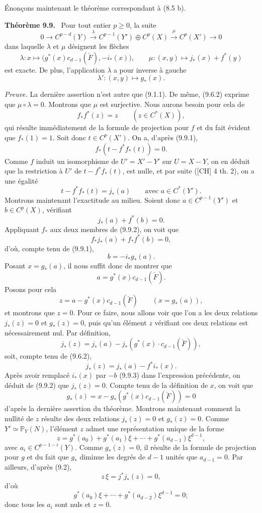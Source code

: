 \documentclass[11pt]{article}
\newenvironment{statement}[1]{\par\medskip\noindent\textbf{#1.}\ }{\par\medskip}
\begin{document}
Énonçons maintenant le théorème correspondant à (8.5 b).

\begin{statement}{Théorème 9.9}
Pour tout entier $p\ge0$, la suite
\[
0\to C^{p-d}(Y)\xrightarrow{\lambda} C^{p-1}(Y')\oplus C^p(X)\xrightarrow{\mu} C^p(X')\to0
\]
dans laquelle $\lambda$ et $\mu$ désignent les flèches
\[
\lambda:x\mapsto\bigl(g^*(x)c_{d-1}(\check F),-i_*(x)\bigr),
\qquad
\mu:(x,y)\mapsto j_*(x)+f^*(y)
\]
est exacte. De plus, l'application $\lambda$ a pour inverse à gauche
\[
\lambda':(x,y)\mapsto g_*(x).
\]
\end{statement}

\emph{Preuve.} La dernière assertion n'est autre que (9.1.1). De même, (9.6.2) exprime que $\mu\circ\lambda=0$. Montrons que $\mu$ est surjective. Nous aurons besoin pour cela de
\[
f_*f^*(z)=z\qquad(z\in C^*(X)),
\tag{9.9.1}
\]
qui résulte immédiatement de la formule de projection pour $f$ et du fait évident que $f_*(1)=1$. Soit donc $t\in C^p(X')$. On a, d'après (9.9.1),
\[
f_*(t-f^*f_*(t))=0.
\]
Comme $f$ induit un isomorphisme de $U'=X'-Y'$ sur $U=X-Y$, on en déduit que la restriction à $U'$ de $t-f^*f_*(t)$, est nulle, et par suite ([CH] 4 th. 2), on a une égalité
\[
t-f^*f_*(t)=j_*(a)
\qquad\text{avec }a\in C^*(Y').
\]
Montrons maintenant l'exactitude au milieu. Soient donc $a\in C^{p-1}(Y')$ et $b\in C^p(X)$, vérifiant
\[
j_*(a)+f^*(b)=0.
\tag{9.9.2}
\]
Appliquant $f_*$ aux deux membres de (9.9.2), on voit que
\[
f_*j_*(a)+f_*f^*(b)=0,
\]
d'où, compte tenu de (9.9.1),
\[
b=-i_*g_*(a).
\tag{9.9.3}
\]
Posant $x=g_*(a)$, il nous suffit donc de montrer que
\[
a=g^*(x)c_{d-1}(\check F).
\tag{9.9.4}
\]
Posons pour cela
\[
z=a-g^*(x)c_{d-1}(\check F)\qquad(x=g_*(a)),
\]
et montrons que $z=0$. Pour ce faire, nous allons voir que l'on a les deux relations $j_*(z)=0$ et $g_*(z)=0$, puis qu'un élément $z$ vérifiant ces deux relations est nécessairement nul. Par définition,
\[
j_*(z)=j_*(a)-j_*(g^*(x)\cdot c_{d-1}(\check F)),
\]
soit, compte tenu de (9.6.2),
\[
j_*(z)=j_*(a)-f^*i_*(x).
\]
Après avoir remplacé $i_*(x)$ par $-b$ (9.9.3) dans l'expression précédente, on déduit de (9.9.2) que $j_*(z)=0$. Compte tenu de la définition de $x$, on voit que
\[
g_*(z)=x-g_*(g^*(x)c_{d-1}(\check F))=0
\]
d'après la dernière assertion du théorème. Montrons maintenant comment la nullité de $z$ résulte des deux relations $j_*(z)=0$ et $g_*(z)=0$. Comme $Y'\simeq\mathbb P_Y(N)$, l'élément $z$ admet une représentation unique de la forme
\[
z=g^*(a_0)+g^*(a_1)\xi+\cdots+g^*(a_{d-1})\xi^{d-1},
\]
avec $a_i\in C^{p-1-i}(Y)$. Comme $g_*(z)=0$, il résulte de la formule de projection pour $g$ et du fait que $g_*$ diminue les degrés de $d-1$ unités que $a_{d-1}=0$. Par ailleurs, d'après (9.2),
\[
z\,\xi=j^*j_*(z)=0,
\]
d'où
\[
g^*(a_0)\xi+\cdots+g^*(a_{d-2})\xi^{d-1}=0;
\]
donc tous les $a_i$ sont nuls et $z=0$.
\end{document}
